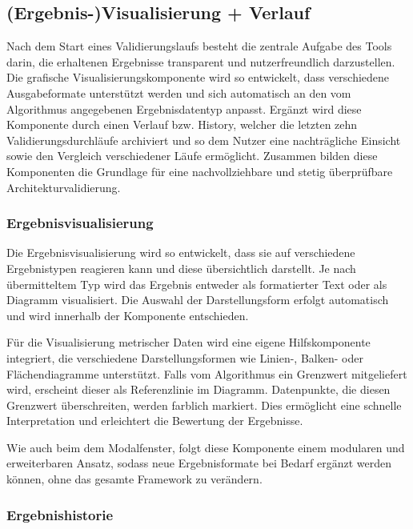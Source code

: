 \subsection{(Ergebnis-)Visualisierung + Verlauf}
\label{subsec:visualisierung}

Nach dem Start eines Validierungslaufs besteht die zentrale Aufgabe des Tools darin, die erhaltenen Ergebnisse transparent und nutzerfreundlich darzustellen. Die grafische Visualisierungskomponente wird so entwickelt, dass verschiedene Ausgabeformate unterstützt werden und sich automatisch an den vom Algorithmus angegebenen Ergebnisdatentyp anpasst. Ergänzt wird diese Komponente durch einen Verlauf bzw. History, welcher die letzten zehn Validierungsdurchläufe archiviert und so dem Nutzer eine nachträgliche Einsicht sowie den Vergleich verschiedener Läufe ermöglicht. Zusammen bilden diese Komponenten die Grundlage für eine nachvollziehbare und stetig überprüfbare Architekturvalidierung.

\subsubsection*{Ergebnisvisualisierung}
\label{subsubsec:ergebnisvis}

Die Ergebnisvisualisierung wird so entwickelt, dass sie auf verschiedene Ergebnistypen reagieren kann und diese übersichtlich darstellt. Je nach übermitteltem Typ wird das Ergebnis entweder als formatierter Text oder als Diagramm visualisiert. Die Auswahl der Darstellungsform erfolgt automatisch und wird innerhalb der Komponente entschieden.

Für die Visualisierung metrischer Daten wird eine eigene Hilfskomponente integriert, die verschiedene Darstellungsformen wie Linien-, Balken- oder Flächendiagramme unterstützt. Falls vom Algorithmus ein Grenzwert mitgeliefert wird, erscheint dieser als Referenzlinie im Diagramm. Datenpunkte, die diesen Grenzwert überschreiten, werden farblich markiert. Dies ermöglicht eine schnelle Interpretation und erleichtert die Bewertung der Ergebnisse.

Wie auch beim dem Modalfenster, folgt diese Komponente einem modularen und erweiterbaren Ansatz, sodass neue Ergebnisformate bei Bedarf ergänzt werden können, ohne das gesamte Framework zu verändern.

\subsubsection*{Ergebnishistorie}
\label{subsubsec:ergebnisverlauf}


